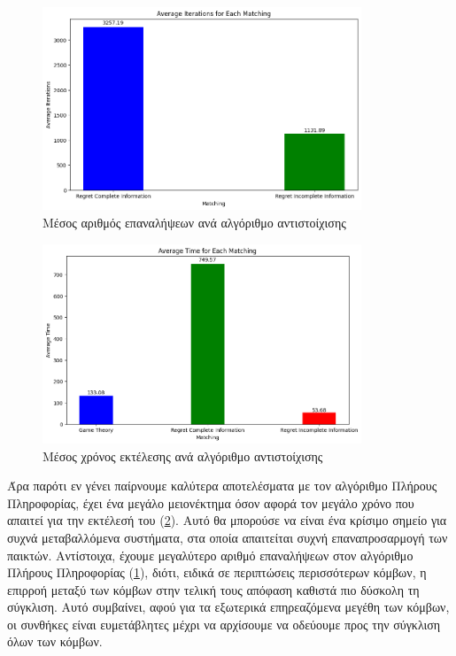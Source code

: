 \begin{figure}[H]
    \centering
    \includegraphics[width=0.85\textwidth]{figures/chapter4/Average_Iterations.png}
    \caption{Μέσος αριθμός επαναλήψεων ανά αλγόριθμο αντιστοίχισης}
    \label{fig29}
\end{figure}

\begin{figure}[H]
    \centering
    \includegraphics[width=0.85\textwidth]{figures/chapter4/Average_Time.png}
    \caption{Μέσος χρόνος εκτέλεσης ανά αλγόριθμο αντιστοίχισης}
    \label{fig30}
\end{figure}

Άρα παρότι εν γένει παίρνουμε καλύτερα αποτελέσματα με τον αλγόριθμο Πλήρους Πληροφορίας, έχει ένα μεγάλο μειονέκτημα όσον αφορά τον μεγάλο χρόνο που απαιτεί για την εκτέλεσή του (\ref{fig30}). Αυτό θα μπορούσε να είναι ένα κρίσιμο σημείο για συχνά μεταβαλλόμενα συστήματα, στα οποία απαιτείται συχνή επαναπροσαρμογή των παικτών. Αντίστοιχα, έχουμε μεγαλύτερο αριθμό επαναλήψεων στον αλγόριθμο Πλήρους Πληροφορίας (\ref{fig29}), διότι, ειδικά σε περιπτώσεις περισσότερων κόμβων, η επιρροή μεταξύ των κόμβων στην τελική τους απόφαση καθιστά πιο δύσκολη τη σύγκλιση. Αυτό συμβαίνει, αφού για τα εξωτερικά επηρεαζόμενα μεγέθη των κόμβων, οι συνθήκες είναι ευμετάβλητες μέχρι να αρχίσουμε να οδεύουμε προς την σύγκλιση όλων των κόμβων.

